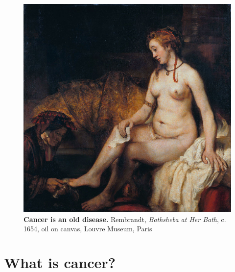 \documentclass[a4paper,12pt,twoside,onecolumn,openright,final,oldfontcommands]{memoir}
\begin{document}
\begin{figure}

{\centering \includegraphics[width=0.9\linewidth]{fig/bath} 

}

\caption[Cancer is an old disease]{\textbf{Cancer is an old disease.} Rembrandt,
\emph{Bathsheba at Her Bath}, c. 1654, oil on canvas, Louvre Museum,
Paris}\label{fig:bath}
\end{figure}





\section{What is cancer?}\label{what-is-cancer}
\end{document}
